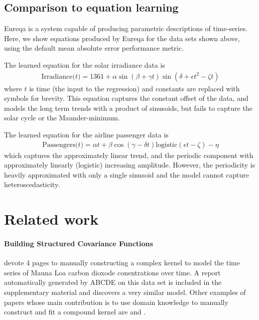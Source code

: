 \documentclass[letterpaper]{article}
\newcommand{\procedurename}{ABCDE}
\begin{document}
\subsection{Comparison to equation learning}


Eureqa \citep{Eureqa} is a system capable of producing parametric descriptions of time-series.
Here, we show equations produced by Eureqa for the data sets shown above, using the default mean absolute error performance metric.


The learned equation for the solar irradiance data is
\begin{align*}
\textrm{Irradiance($t$)} = 1361 + \alpha\sin(\beta + \gamma t)\sin(\delta + \epsilon t^2 - \zeta t)
\end{align*}
where $t$ is time (the input to the regression) and constants are replaced with symbols for brevity.
This equation captures the constant offset of the data, and models the long term trends with a product of sinusoids, but fails to capture the solar cycle or the Maunder-minimum.

The learned equation for the airline passenger data is
\begin{align*}
\textrm{Passengers($t$)} = \alpha t + \beta\cos(\gamma - \delta t)\textrm{logistic}(\epsilon t - \zeta) - \eta
\end{align*}
which captures the approximately linear trend, and the periodic component with approximately linearly (logistic) increasing amplitude.
However, the periodicity is heavily approximated with only a single sinusoid and the model cannot capture heteroscedasticity.





\section{Related work}
\label{sec:related-work}

\paragraph{Building Structured Covariance Functions}
\cite{rasmussen38gaussian} devote 4 pages to manually constructing a complex kernel to model the time series of Mauna Loa carbon dioxode conentrations over time.
A report automatically generated by \procedurename{} on this data set is included in the supplementary material and discovers a very similar model. 
Other examples of papers whose main contribution is to use domain knowledge to manually construct and fit a compound \gp{} kernel are \cite{klenske2012nonparametric} and \cite{lloydgefcom2012}.
\end{document}
